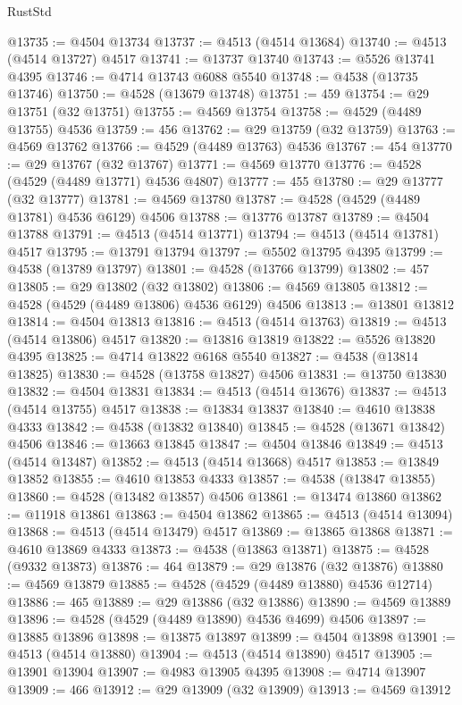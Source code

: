 \begin{lexlean}{RustStd}
\begin{coremodule}
@13735 := @4504 @13734
@13737 := @4513 (@4514 @13684)
@13740 := @4513 (@4514 @13727) @4517
@13741 := @13737 @13740
@13743 := @5526 @13741 @4395
@13746 := @4714 @13743 @6088 @5540
@13748 := @4538 (@13735 @13746)
@13750 := @4528 (@13679 @13748)
@13751 := 459
@13754 := @29 @13751 (@32 @13751)
@13755 := @4569 @13754
@13758 := @4529 (@4489 @13755) @4536
@13759 := 456
@13762 := @29 @13759 (@32 @13759)
@13763 := @4569 @13762
@13766 := @4529 (@4489 @13763) @4536
@13767 := 454
@13770 := @29 @13767 (@32 @13767)
@13771 := @4569 @13770
@13776 := @4528 (@4529 (@4489 @13771) @4536 @4807)
@13777 := 455
@13780 := @29 @13777 (@32 @13777)
@13781 := @4569 @13780
@13787 := @4528 (@4529 (@4489 @13781) @4536 @6129) @4506
@13788 := @13776 @13787
@13789 := @4504 @13788
@13791 := @4513 (@4514 @13771)
@13794 := @4513 (@4514 @13781) @4517
@13795 := @13791 @13794
@13797 := @5502 @13795 @4395
@13799 := @4538 (@13789 @13797)
@13801 := @4528 (@13766 @13799)
@13802 := 457
@13805 := @29 @13802 (@32 @13802)
@13806 := @4569 @13805
@13812 := @4528 (@4529 (@4489 @13806) @4536 @6129) @4506
@13813 := @13801 @13812
@13814 := @4504 @13813
@13816 := @4513 (@4514 @13763)
@13819 := @4513 (@4514 @13806) @4517
@13820 := @13816 @13819
@13822 := @5526 @13820 @4395
@13825 := @4714 @13822 @6168 @5540
@13827 := @4538 (@13814 @13825)
@13830 := @4528 (@13758 @13827) @4506
@13831 := @13750 @13830
@13832 := @4504 @13831
@13834 := @4513 (@4514 @13676)
@13837 := @4513 (@4514 @13755) @4517
@13838 := @13834 @13837
@13840 := @4610 @13838 @4333
@13842 := @4538 (@13832 @13840)
@13845 := @4528 (@13671 @13842) @4506
@13846 := @13663 @13845
@13847 := @4504 @13846
@13849 := @4513 (@4514 @13487)
@13852 := @4513 (@4514 @13668) @4517
@13853 := @13849 @13852
@13855 := @4610 @13853 @4333
@13857 := @4538 (@13847 @13855)
@13860 := @4528 (@13482 @13857) @4506
@13861 := @13474 @13860
@13862 := @11918 @13861
@13863 := @4504 @13862
@13865 := @4513 (@4514 @13094)
@13868 := @4513 (@4514 @13479) @4517
@13869 := @13865 @13868
@13871 := @4610 @13869 @4333
@13873 := @4538 (@13863 @13871)
@13875 := @4528 (@9332 @13873)
@13876 := 464
@13879 := @29 @13876 (@32 @13876)
@13880 := @4569 @13879
@13885 := @4528 (@4529 (@4489 @13880) @4536 @12714)
@13886 := 465
@13889 := @29 @13886 (@32 @13886)
@13890 := @4569 @13889
@13896 := @4528 (@4529 (@4489 @13890) @4536 @4699) @4506
@13897 := @13885 @13896
@13898 := @13875 @13897
@13899 := @4504 @13898
@13901 := @4513 (@4514 @13880)
@13904 := @4513 (@4514 @13890) @4517
@13905 := @13901 @13904
@13907 := @4983 @13905 @4395
@13908 := @4714 @13907
@13909 := 466
@13912 := @29 @13909 (@32 @13909)
@13913 := @4569 @13912

\end{coremodule}
\end{lexlean}
